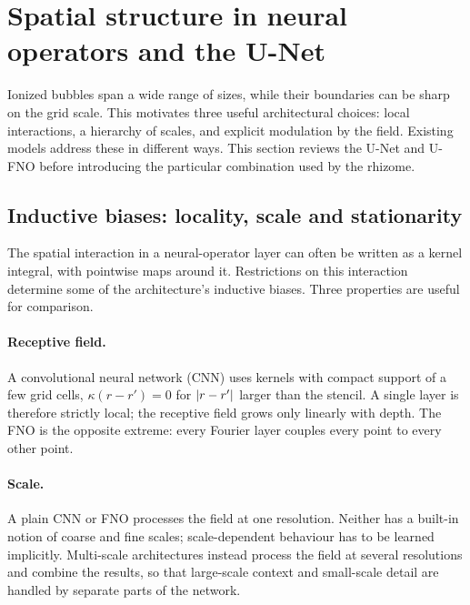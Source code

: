 \section{Spatial structure in neural operators and the U-Net}
\label{sec:spatial-structure}

Ionized bubbles span a wide range of sizes, while their boundaries can be sharp on the grid scale. This motivates three useful architectural choices: local interactions, a hierarchy of scales, and explicit modulation by the field. Existing models address these in different ways. This section reviews the U-Net and U-FNO before introducing the particular combination used by the rhizome.

\subsection{Inductive biases: locality, scale and stationarity}
\label{sec:inductive-biases}

The spatial interaction in a neural-operator layer can often be written as a kernel integral, with pointwise maps around it. Restrictions on this interaction determine some of the architecture's inductive biases. Three properties are useful for comparison.

\paragraph{Receptive field.} A convolutional neural network (CNN) uses kernels with compact support of a few grid cells, $\kappa(r-r')=0$ for $\lvert r-r'\rvert$ larger than the stencil. A single layer is therefore strictly local; the receptive field grows only linearly with depth. The FNO is the opposite extreme: every Fourier layer couples every point to every other point.

\paragraph{Scale.} A plain CNN or FNO processes the field at one resolution. Neither has a built-in notion of coarse and fine scales; scale-dependent behaviour has to be learned implicitly. Multi-scale architectures instead process the field at several resolutions and combine the results, so that large-scale context and small-scale detail are handled by separate parts of the network.

